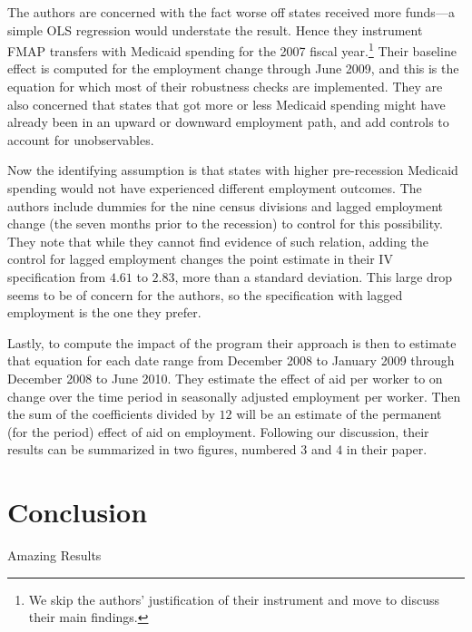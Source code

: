 \documentclass[11pt]{article}
\begin{document}
The authors are concerned with the fact worse off states received more funds---a simple OLS regression would understate the result. Hence they instrument FMAP transfers with Medicaid spending for the 2007 fiscal year.\footnote{We skip the authors' justification of their instrument and move to discuss their main findings.} Their baseline effect is computed for the employment change through June 2009, and this is the equation for which most of their robustness checks are implemented. They are also concerned that states that got more or less Medicaid spending might have already been in an upward or downward employment path, and add controls to account for unobservables.

Now the identifying assumption is that states with higher pre-recession Medicaid spending would not have experienced different employment outcomes. The authors include dummies for the nine census divisions and lagged employment change (the seven months prior to the recession) to control for this possibility. They note that while they cannot find evidence of such relation, adding the control for lagged employment changes the point estimate in their IV specification from $4.61$ to $2.83$, more than a standard deviation. This large drop seems to be of concern for the authors, so the specification with lagged employment is the one they prefer.

Lastly, to compute the impact of the program their approach is then to estimate that equation for each date range from December 2008 to January 2009 through December 2008 to June 2010. They estimate the effect of aid per worker to on change over the time period in seasonally adjusted employment per worker. Then the sum of the coefficients divided by $12$ will be an estimate of the permanent (for the period) effect of aid on employment. Following our discussion, their results can be summarized in two figures, numbered $3$ and $4$ in their paper.

\section{Conclusion}
\label{sec:conclusion}

Amazing Results

\end{document}
